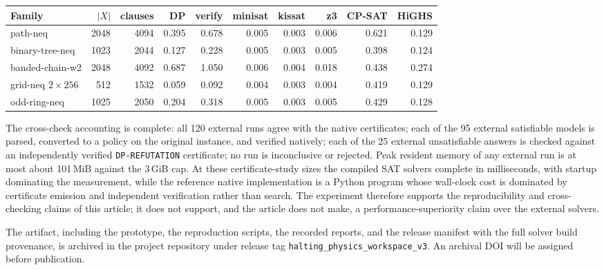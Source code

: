 \documentclass[11pt]{article}
\theoremstyle{plain}
\theoremstyle{definition}
\theoremstyle{remark}
\begin{document}
\begin{center}
\begin{tabular}{@{}lrrrrrrrrr@{}}
\toprule
Family & $|X|$ & clauses & DP & verify & minisat & kissat & z3 & CP-SAT & HiGHS\\
\midrule
path-neq & 2048 & 4094 & 0.395 & 0.678 & 0.005 & 0.003 & 0.006 & 0.621 & 0.129\\
binary-tree-neq & 1023 & 2044 & 0.127 & 0.228 & 0.005 & 0.003 & 0.005 & 0.398 & 0.124\\
banded-chain-w2 & 2048 & 4092 & 0.687 & 1.050 & 0.006 & 0.004 & 0.018 & 0.438 & 0.274\\
grid-neq $2\times 256$ & 512 & 1532 & 0.059 & 0.092 & 0.004 & 0.003 & 0.004 & 0.419 & 0.129\\
odd-ring-neq & 1025 & 2050 & 0.204 & 0.318 & 0.005 & 0.003 & 0.005 & 0.429 & 0.128\\
\bottomrule
\end{tabular}
\label{tab:external-baselines}
\end{center}

The cross-check accounting is complete: all 120 external runs agree with the
native certificates; each of the 95 external satisfiable models is parsed,
converted to a policy on the original instance, and verified natively; each of
the 25 external unsatisfiable answers is checked against an independently
verified \texttt{DP-REFUTATION} certificate; no run is inconclusive or
rejected.  Peak resident memory of any external run is at most about
101\,MiB against the 3\,GiB cap.  At these certificate-study sizes the
compiled SAT solvers complete in milliseconds, with startup dominating the
measurement, while the reference native implementation is a Python program
whose wall-clock cost is dominated by certificate emission and independent
verification rather than search.  The experiment therefore supports the
reproducibility and cross-checking claims of this article; it does not support,
and the article does not make, a performance-superiority claim over the
external solvers.

The artifact, including the prototype, the reproduction scripts, the recorded
reports, and the release manifest with the full solver build provenance, is
archived in the project repository under release tag
\texttt{halting\_physics\_workspace\_v3}.  An archival DOI will be assigned
before publication.
\end{document}
